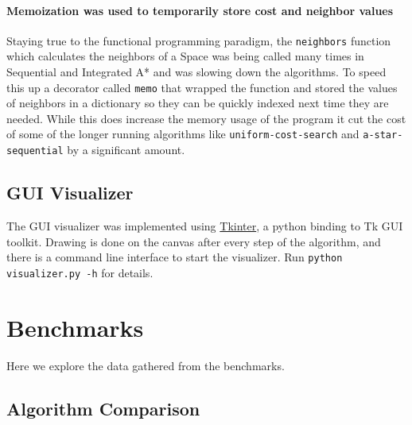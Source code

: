 \documentclass[11pt,letter]{article}
\begin{document}
\paragraph{Memoization was used to temporarily store cost and neighbor values}
Staying true to the functional programming paradigm, the \verb_neighbors_ function which calculates the neighbors of a Space was being called many times in Sequential and Integrated A* and was slowing down the algorithms. To speed this up a decorator called \verb_memo_ that wrapped the function and stored the values of neighbors in a dictionary so they can be quickly indexed next time they are needed. While this does increase the memory usage of the program it cut the cost of some of the longer running algorithms like \verb_uniform-cost-search_ and \verb_a-star-sequential_ by a significant amount.

\subsection{GUI Visualizer}
The GUI visualizer was implemented using \href{https://docs.python.org/2/library/tkinter.html}{Tkinter}, a python binding to Tk GUI toolkit. Drawing is done on the canvas after every step of the algorithm, and there is a command line interface to start the visualizer. Run \verb_python visualizer.py -h_ for details.


\section{Benchmarks}
Here we explore the data gathered from the benchmarks.

\subsection{Algorithm Comparison} \label{algorithm comparison}
\begin{center}
\end{center}
\end{document}
